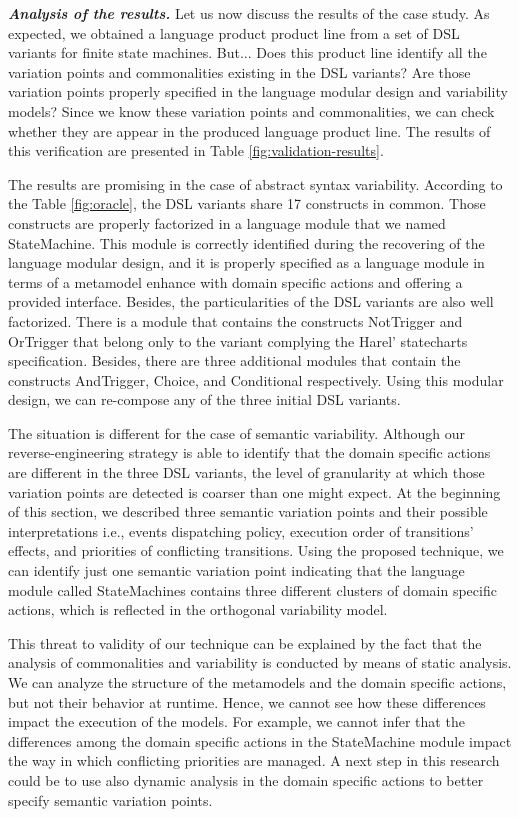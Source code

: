 \vspace{2mm}
\textbf{\textit{Analysis of the results.}} Let us now discuss the results of the case study. As expected, we obtained a language product product line from a set of DSL variants for finite state machines. But... Does this product line identify all the variation points and commonalities existing in the DSL variants? Are those variation points properly specified in the language modular design and variability models? Since we know these variation points and commonalities, we can check whether they are appear in the produced language product line. The results of this verification are presented in Table \ref{fig:validation-results}.

The results are promising in the case of abstract syntax variability. According to the Table \ref{fig:oracle}, the DSL variants share 17 constructs in common. Those constructs are properly factorized in a language module that we named StateMachine. This module is correctly identified during the recovering of the language modular design, and it is properly specified as a language module in terms of a metamodel enhance with domain specific actions and offering a provided interface. Besides, the particularities of the DSL variants are also well factorized. There is a module that contains the constructs NotTrigger and OrTrigger that belong only to the variant complying the Harel' statecharts specification. Besides, there are three additional modules that contain the constructs AndTrigger, Choice, and Conditional respectively. Using this modular design, we can re-compose any of the three initial DSL variants.

The situation is different for the case of semantic variability. Although our reverse-engineering strategy is able to identify that the domain specific actions are different in the three DSL variants, the level of granularity at which those variation points are detected is coarser than one might expect. At the beginning of this section, we described three semantic variation points and their possible interpretations i.e., events dispatching policy, execution order of transitions' effects, and priorities of conflicting transitions. Using the proposed technique, we can identify just one semantic variation point indicating that the language module called StateMachines contains three different clusters of domain specific actions, which is reflected in the orthogonal variability model.

This threat to validity of our technique can be explained by the fact that the analysis of commonalities and variability is conducted by means of static analysis. We can analyze the structure of the metamodels and the domain specific actions, but not their behavior at runtime. Hence, we cannot see how these differences impact the execution of the models. For example, we cannot infer that the differences among the domain specific actions in the StateMachine module impact the way in which conflicting priorities are managed. A next step in this research could be to use also dynamic analysis in the domain specific actions to better specify semantic variation points.

